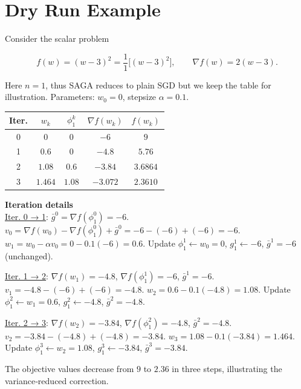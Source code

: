 \documentclass{article}
\begin{document}
\section*{Dry Run Example}
Consider the scalar problem  

\[
f(w)= (w-3)^2=\frac1{1}\bigl[(w-3)^2\bigr],\qquad 
\nabla f(w)=2(w-3).
\]

Here $n=1$, thus SAGA reduces to plain SGD but we keep the table for illustration.  
Parameters: $w_0=0$, stepsize $\alpha=0.1$.

\begin{center}
\begin{tabular}{c|c|c|c|c}
\textbf{Iter.}&$w_k$&$\phi_1^k$&$\nabla f(w_k)$&$f(w_k)$\\ \hline
0&$0$&$0$&$-6$&$9$\\
1&$0.6$&$0$&$-4.8$&$5.76$\\
2&$1.08$&$0.6$&$-3.84$&$3.6864$\\
3&$1.464$&$1.08$&$-3.072$&$2.3610$\\
\end{tabular}
\end{center}

\textbf{Iteration details}\\
\underline{Iter. 0 → 1}:  
$\bar g^{0}= \nabla f(\phi_1^0)= -6$.  
$v_0 = \nabla f(w_0)-\nabla f(\phi_1^0)+\bar g^{0}= -6-(-6)+(-6)=-6$.  
$w_1 = w_0-\alpha v_0 =0-0.1(-6)=0.6$.  
Update $\phi_1^1 \gets w_0=0$, $g_1^1\gets -6$, $\bar g^{1}= -6$ (unchanged).

\underline{Iter. 1 → 2}:  
$\nabla f(w_1)=-4.8$, $\nabla f(\phi_1^1)=-6$, $\bar g^{1}=-6$.  
$v_1 = -4.8-(-6)+(-6) = -4.8$.  
$w_2 =0.6-0.1(-4.8)=1.08$.  
Update $\phi_1^2\gets w_1=0.6$, $g_1^2\gets -4.8$, $\bar g^{2}= -4.8$.

\underline{Iter. 2 → 3}:  
$\nabla f(w_2)=-3.84$, $\nabla f(\phi_1^2)=-4.8$, $\bar g^{2}= -4.8$.  
$v_2 = -3.84-(-4.8)+(-4.8)= -3.84$.  
$w_3 =1.08-0.1(-3.84)=1.464$.  
Update $\phi_1^3\gets w_2=1.08$, $g_1^3\gets -3.84$, $\bar g^{3}= -3.84$.

The objective values decrease from $9$ to $2.36$ in three steps, illustrating the variance‑reduced correction.

\end{document}
